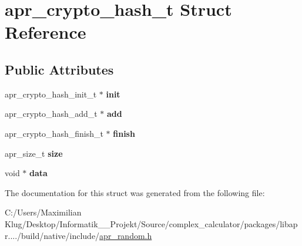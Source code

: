 \hypertarget{structapr__crypto__hash__t}{}\section{apr\+\_\+crypto\+\_\+hash\+\_\+t Struct Reference}
\label{structapr__crypto__hash__t}
\subsection*{Public Attributes}
\begin{DoxyCompactItemize}
\item 
\mbox{\label{structapr__crypto__hash__t_a3b0a8b85bc2207235024a9e64febab69}} 
apr\+\_\+crypto\+\_\+hash\+\_\+init\+\_\+t $\ast$ {\bfseries init}
\item 
\mbox{\label{structapr__crypto__hash__t_a60c77281aca26fdb500c3ef899908abb}} 
apr\+\_\+crypto\+\_\+hash\+\_\+add\+\_\+t $\ast$ {\bfseries add}
\item 
\mbox{\label{structapr__crypto__hash__t_abd6933f64b61c595788ddf0f16d5b48c}} 
apr\+\_\+crypto\+\_\+hash\+\_\+finish\+\_\+t $\ast$ {\bfseries finish}
\item 
\mbox{\label{structapr__crypto__hash__t_ade59f47b349e3a9eef98097fb87fbf72}} 
apr\+\_\+size\+\_\+t {\bfseries size}
\item 
\mbox{\label{structapr__crypto__hash__t_a0211f5be5ddce65dee1ea0720d39e8e3}} 
void $\ast$ {\bfseries data}
\end{DoxyCompactItemize}


The documentation for this struct was generated from the following file\+:\begin{DoxyCompactItemize}
\item 
C\+:/\+Users/\+Maximilian Klug/\+Desktop/\+Informatik\+\_\+\_\+\+Projekt/\+Source/complex\+\_\+calculator/packages/libapr..../build/native/include/\mbox{\hyperlink{apr__random_8h}{apr\+\_\+random.\+h}}\end{DoxyCompactItemize}
